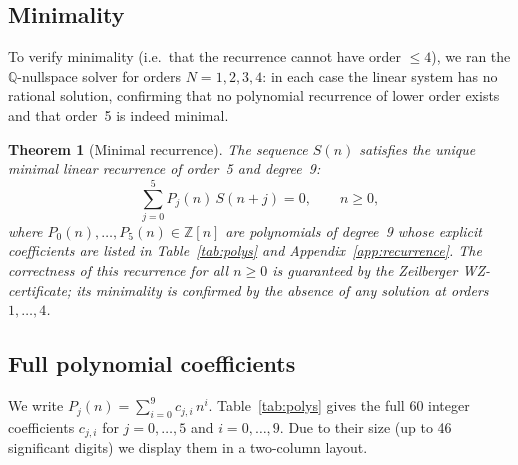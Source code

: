 \documentclass[11pt, a4paper]{article}
\newtheorem{theorem}{Theorem}
\begin{document}
\subsection{Minimality}

To verify minimality (i.e.\ that the recurrence cannot have order $\le 4$),
we ran the $\mathbb{Q}$-nullspace solver for orders $N=1,2,3,4$: in each
case the linear system has no rational solution, confirming that no
polynomial recurrence of lower order exists and that order~5 is indeed
minimal.

\begin{theorem}[Minimal recurrence]\label{thm:recurrence}
The sequence $S(n)$ satisfies the unique minimal linear recurrence of
order~5 and degree~9:
\begin{equation}\label{eq:recurrence}
  \sum_{j=0}^{5} P_j(n)\, S(n+j) = 0, \qquad n \ge 0,
\end{equation}
where $P_0(n), \dots, P_5(n) \in \mathbb{Z}[n]$ are polynomials of
degree~9 whose explicit coefficients are listed in
Table~\ref{tab:polys} and Appendix~\ref{app:recurrence}.
The correctness of this recurrence for all $n\ge 0$ is guaranteed by the
Zeilberger WZ-certificate; its minimality is confirmed by the absence of
any solution at orders $1,\dots,4$.
\end{theorem}

\subsection{Full polynomial coefficients}

We write $P_j(n) = \sum_{i=0}^9 c_{j,i}\,n^i$.
Table~\ref{tab:polys} gives the full 60 integer coefficients
$c_{j,i}$ for $j=0,\dots,5$ and $i=0,\dots,9$.  Due to their size
(up to 46 significant digits) we display them in a two-column layout.
\end{document}
